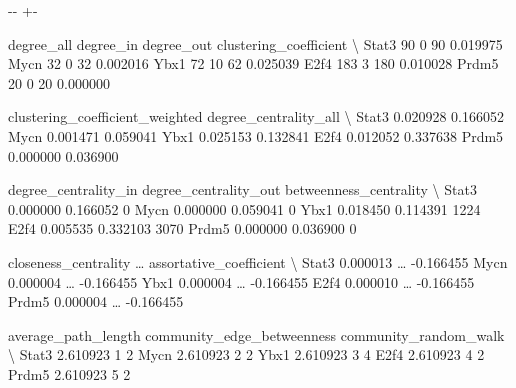 \documentclass[letterpaper,10pt,english]{sphinxmanual}
\newlength\nbsphinxcodecellspacing
\begin{document}
{

\kern-\sphinxverbatimsmallskipamount\kern-\baselineskip
\kern+\FrameHeightAdjust\kern-\fboxrule
\vspace{\nbsphinxcodecellspacing}

\begin{sphinxVerbatim}[commandchars=\\\{\}]
\llap{\color{nbsphinxout}[33]:\,\hspace{\fboxrule}\hspace{\fboxsep}}       degree\_all  degree\_in  degree\_out  clustering\_coefficient  \textbackslash{}
Stat3          90          0          90                0.019975
Mycn           32          0          32                0.002016
Ybx1           72         10          62                0.025039
E2f4          183          3         180                0.010028
Prdm5          20          0          20                0.000000

       clustering\_coefficient\_weighted  degree\_centrality\_all  \textbackslash{}
Stat3                         0.020928               0.166052
Mycn                          0.001471               0.059041
Ybx1                          0.025153               0.132841
E2f4                          0.012052               0.337638
Prdm5                         0.000000               0.036900

       degree\_centrality\_in  degree\_centrality\_out  betweenness\_centrality  \textbackslash{}
Stat3              0.000000               0.166052                       0
Mycn               0.000000               0.059041                       0
Ybx1               0.018450               0.114391                    1224
E2f4               0.005535               0.332103                    3070
Prdm5              0.000000               0.036900                       0

       closeness\_centrality  {\ldots}  assortative\_coefficient  \textbackslash{}
Stat3              0.000013  {\ldots}                -0.166455
Mycn               0.000004  {\ldots}                -0.166455
Ybx1               0.000004  {\ldots}                -0.166455
E2f4               0.000010  {\ldots}                -0.166455
Prdm5              0.000004  {\ldots}                -0.166455

       average\_path\_length  community\_edge\_betweenness  community\_random\_walk  \textbackslash{}
Stat3             2.610923                           1                      2
Mycn              2.610923                           2                      2
Ybx1              2.610923                           3                      4
E2f4              2.610923                           4                      2
Prdm5             2.610923                           5                      2


\end{sphinxVerbatim}}
\end{document}
